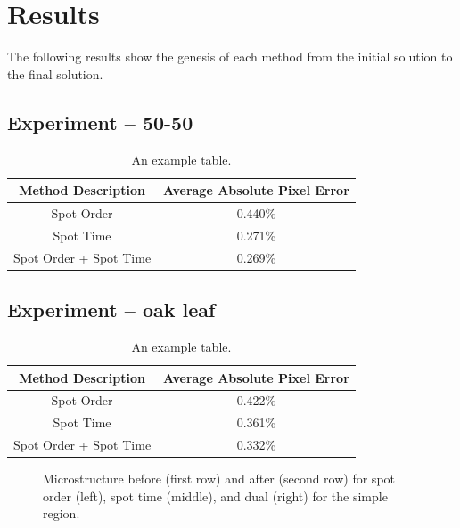\documentclass[a4paper]{article}
\begin{document}
\section{Results}
\label{sec:results}

The following results show the genesis of each method from the initial solution to the final solution. 


\subsection{Experiment – 50-50}
\label{subsec:result50-50}

\begin{table}
\centering
\begin{tabular}{c|c}
\textbf{Method Description} & \textbf{Average Absolute Pixel Error} \\\hline
Spot Order & 0.440\% \\
Spot Time & 0.271\% \\
Spot Order + Spot Time & 0.269\%
\end{tabular}
\caption{\label{tab:result50}An example table.}
\end{table}

\subsection{Experiment – oak leaf}
\label{subsec:resultleaf}

\begin{table}
\centering
\begin{tabular}{c|c}
\textbf{Method Description} & \textbf{Average Absolute Pixel Error} \\\hline
Spot Order & 0.422\% \\
Spot Time & 0.361\% \\
Spot Order + Spot Time & 0.332\%
\end{tabular}
\caption{\label{tab:resultleaf}An example table.}
\end{table}


\begin{figure}
\centering
{}
\caption{\label{fig:result50}Microstructure before (first row) and after (second row) for spot order (left), spot time (middle), and dual (right) for the simple region.}
\end{figure}
\end{document}
